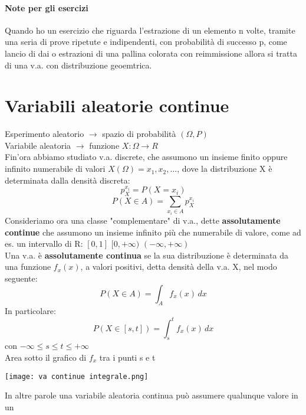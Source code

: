 \paragraph*{Note per gli esercizi}
Quando ho un esercizio che riguarda l'estrazione di un elemento n volte, tramite una seria
di prove ripetute e indipendenti, con probabilità di successo p, come lancio di dai o
estrazioni di una pallina colorata con reimmissione allora si tratta di una v.a. con
distribuzione geoemtrica.

\section{Variabili aleatorie continue}
Esperimento aleatorio $\to$ spazio di probabilità $(\Omega, P)$
\\ Variabile aleatoria $\to$ funzione $X:\Omega \to R$
\\Fin'ora abbiamo studiato v.a. discrete, che assumono un insieme finito oppure
infinito numerabile di valori $X(\Omega) = {x_1, x_2, \dots}$, dove la distribuzione
X è determinata dalla densità discreta:
\begin{equation*}
    p_X^{x_i} = P(X=x_i)
\end{equation*}
\begin{equation}
    P(X \in A) = \sum_{x_i \in A}p_X^{x_i}  
\end{equation}
Consideriamo ora una classe "complementare" di v.a., dette \textbf{assolutamente continue}
che assumono un insieme infinito più che numerabile di valore, come ad es. un intervallo
di R: $[0, 1]$ $[0, +\infty)$ $(-\infty, +\infty)$
\\ Una v.a. è \textbf{assolutamente continua} se la sua distribuzione è determinata
da una funzione $f_x(x)$, a valori positivi, detta densità della v.a. X, nel modo
seguente:
\begin{equation*}
    P(X \in A) = \int_{A}f_x (x) \,dx 
\end{equation*}
In particolare:
\begin{equation*}
    P(X\in[s,t]) = \int_{s}^{t} f_x (x)\,dx 
\end{equation*}
con $-\infty \leq s \leq t \leq +\infty$
\\Area sotto il grafico di $f_x$ tra i punti s e t
\begin{center}
    \texttt{[image: va continue integrale.png]}
\end{center}
In altre parole una variabile aleatoria continua può assumere qualunque valore in un
